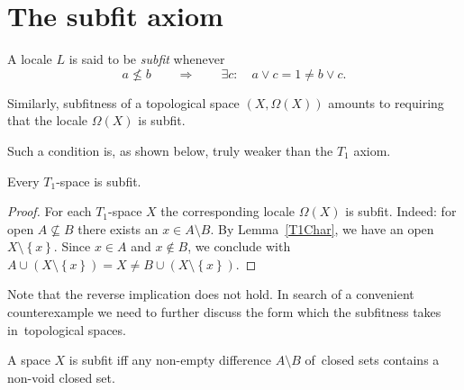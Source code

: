 \section{The subfit axiom}

\begin{df}[Sfit]
  A locale $L$ is said to be \emph{subfit\/} whenever
  \[
    a \not\le b \qquad \Rightarrow \qquad \exists c: \quad a \vee c = 1 \ne b
    \vee c.
  \]
\end{df}

Similarly, subfitness of a topological space $(X, \Omega(X))$ amounts to
requiring that the locale $\Omega(X)$ is subfit.

Such a condition is, as shown below, truly weaker than the $T_1$ axiom.

\begin{prop} \label{T1->Sfit}
  Every $T_1$-space is subfit.
\end{prop}

\begin{proof}
  For each $T_1$-space $X$ the corresponding locale $\Omega(X)$ is subfit.
  Indeed: for open $A\not\subseteq B$ there exists an $x\in A \setminus B$.
  By Lemma~\ref{T1Char}\thinspace, we have an open $X\setminus
  \left\{x\right\}$.
  Since $x\in A$ and $x\not\in B$, we conclude with $A\cup (X\setminus
  \left\{x\right\}) = X \ne B \cup (X\setminus \left\{x\right\})$.
\end{proof}

Note that the reverse implication does not hold.
In search of a convenient counterexample we need to further discuss the form
which the subfitness takes in~topological spaces.

\begin{prop}
  A space $X$ is subfit iff any non-empty difference $A\setminus B$ of~closed
  sets contains a non-void closed set.
\end{prop}

